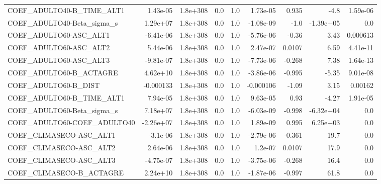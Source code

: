 \begin{tabular}{lrrrrrrrr}
COEF\_ADULTO40-B\_TIME\_ALT1         &    1.43e-05 &     1.8e+308 &     0.0 &      1.0 &   1.73e-05 &       0.935 &         -4.8 &      1.59e-06 \\
COEF\_ADULTO40-Beta\_sigma\_s        &    1.29e+07 &     1.8e+308 &     0.0 &      1.0 &  -1.08e-09 &        -1.0 &    -1.39e+05 &           0.0 \\
COEF\_ADULTO60-ASC\_ALT1            &   -6.41e-06 &     1.8e+308 &     0.0 &      1.0 &  -5.76e-06 &       -0.36 &         3.43 &      0.000613 \\
COEF\_ADULTO60-ASC\_ALT2            &    5.44e-06 &     1.8e+308 &     0.0 &      1.0 &   2.47e-07 &      0.0107 &         6.59 &      4.41e-11 \\
COEF\_ADULTO60-ASC\_ALT3            &   -9.81e-07 &     1.8e+308 &     0.0 &      1.0 &  -7.73e-06 &      -0.268 &         7.38 &      1.64e-13 \\
COEF\_ADULTO60-B\_ACTAGRE           &    4.62e+10 &     1.8e+308 &     0.0 &      1.0 &  -3.86e-06 &      -0.995 &        -5.35 &      9.01e-08 \\
COEF\_ADULTO60-B\_DIST              &   -0.000133 &     1.8e+308 &     0.0 &      1.0 &  -0.000106 &       -1.09 &         3.15 &       0.00162 \\
COEF\_ADULTO60-B\_TIME\_ALT1         &    7.94e-05 &     1.8e+308 &     0.0 &      1.0 &   9.63e-05 &        0.93 &        -4.27 &      1.91e-05 \\
COEF\_ADULTO60-Beta\_sigma\_s        &    7.18e+07 &     1.8e+308 &     0.0 &      1.0 &  -6.03e-09 &      -0.998 &    -6.32e+04 &           0.0 \\
COEF\_ADULTO60-COEF\_ADULTO40       &   -2.26e+07 &     1.8e+308 &     0.0 &      1.0 &   1.89e-09 &       0.995 &     6.25e+03 &           0.0 \\
COEF\_CLIMASECO-ASC\_ALT1           &    -3.1e-06 &     1.8e+308 &     0.0 &      1.0 &  -2.79e-06 &      -0.361 &         19.7 &           0.0 \\
COEF\_CLIMASECO-ASC\_ALT2           &    2.64e-06 &     1.8e+308 &     0.0 &      1.0 &    1.2e-07 &      0.0107 &         17.9 &           0.0 \\
COEF\_CLIMASECO-ASC\_ALT3           &   -4.75e-07 &     1.8e+308 &     0.0 &      1.0 &  -3.75e-06 &      -0.268 &         16.4 &           0.0 \\
COEF\_CLIMASECO-B\_ACTAGRE          &    2.24e+10 &     1.8e+308 &     0.0 &      1.0 &  -1.87e-06 &      -0.997 &         61.8 &           0.0 \\

\end{tabular}
